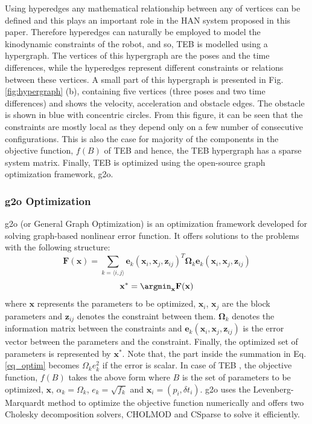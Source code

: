 Using hyperedges any mathematical relationship between any of vertices can be defined and this plays an important role in the HAN system proposed in this paper. Therefore hyperedges can naturally be employed to model the kinodynamic constraints of the robot, and so, TEB is modelled using a hypergraph. The vertices of this hypergraph are the poses and the time differences, while the hyperedges represent different constraints or relations between these vertices. A small part of this hypergraph is presented in Fig. \ref{fig:hypergraph} (b), containing five vertices (three poses and two time differences) and shows the velocity, acceleration and obstacle edges. The obstacle is shown in blue with concentric circles. From this figure, it can be seen that the constraints are mostly local as they depend only on a few number of consecutive configurations. This is also the case for majority of the components in the objective function, $f(B)$ of TEB and hence, the TEB hypergraph has a sparse system matrix. Finally, TEB is optimized using the open-source graph optimization framework, g2o. 

\subsubsection{g2o Optimization}
g2o (or General Graph Optimization) \cite{grisetti2011g2o} is an optimization framework developed for solving graph-based nonlinear error function. It offers solutions to the problems with the following structure:
\begin{equation}
\label{eq_optim}
  \mathbf{F(x)} = \sum_{k=\langle i,j \rangle} \mathbf{e}_k(\mathbf{x}_i, \mathbf{x}_j, \mathbf{z}_{ij})^T \mathbf{\Omega}_k\mathbf{e}_k(\mathbf{x}_i, \mathbf{x}_j, \mathbf{z}_{ij}) 
\end{equation}
\begin{equation}
    \mathbf{x}^* = \argmin_\mathbf{x} \mathbf{F(x)}
\end{equation}
where $\mathbf{x}$ represents the parameters to be optimized, $\mathbf{x}_i$, $\mathbf{x}_j$ are the block parameters and $\mathbf{z}_{ij}$ denotes the constraint between them. $\mathbf{\Omega}_k$ denotes the information matrix between the constraints and $\mathbf{e}_k(\mathbf{x}_i, \mathbf{x}_j, \mathbf{z}_{ij})$ is the error vector between the parameters and the constraint. Finally, the optimized set of parameters is represented by $\mathbf{x}^*$. Note that, the part inside the summation in Eq. \eqref{eq_optim} becomes $\Omega_k e_k^2$ if the error is scalar. In case of TEB \cite{rosmann2013efficient}, the objective function, $f(B)$ takes the above form where $B$ is the set of parameters to be optimized, $\mathbf{x}$, $\alpha_k = \Omega_k$, $e_k = \sqrt{f_k}$ and $\mathbf{x}_i = (p_i, \delta t_i)$. g2o uses the Levenberg-Marquardt method to optimize the objective function numerically and offers two Cholesky decomposition solvers, CHOLMOD and CSparse to solve it efficiently.
